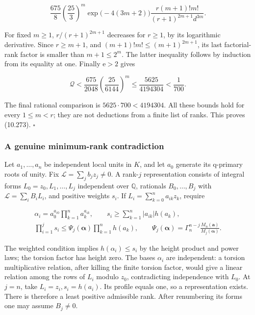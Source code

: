 \documentclass[
  11pt,
  a4paper,
]{article}
\begin{document}
\[
\frac{675}{8}\left(\frac{25}{3}\right)^m
\exp\bigl(-4(3m+2)\bigr)
\frac{r(m+1)!m!}{(r+1)^{2m+1}d^{3m}}.
\]

For fixed \(m\ge1\), \(r/(r+1)^{2m+1}\) decreases for \(r\ge1\), by its
logarithmic derivative. Since \(r\ge m+1\), and
\((m+1)!m!\le(m+1)^{2m+1}\), its last factorial-rank factor is smaller
than \(m+1\le2^m\). The latter inequality follows by induction from its
equality at one. Finally \(\mathrm e>2\) gives

\[
\mathcal Q<
\frac{675}{2048}\left(\frac{25}{6144}\right)^m
\le\frac{5625}{4194304}<\frac1{700}.
\tag{10.276}
\]

The final rational comparison is \(5625\cdot700<4194304\). All these
bounds hold for every \(1\le m<r\); they are not deductions from a
finite list of ranks. This proves (10.273). \(\square\)

\subsubsection{A genuine minimum-rank
contradiction}\label{a-genuine-minimum-rank-contradiction}

Let \(a_1,\ldots,a_n\) be independent local units in \(K\), and let
\(a_0\) generate its q-primary roots of unity. Fix
\(\mathcal L=\sum_jb_jz_j\ne0\). A rank-\(j\) representation consists of
integral forms \(L_0=z_0,L_1,\ldots,L_j\) independent over
\(\mathbb Q\), rationals \(B_0,\ldots,B_j\) with
\(\mathcal L=\sum_iB_iL_i\), and positive weights \(s_i\). If
\(L_i=\sum_{k=0}^na_{ik}z_k\), require

\[
\begin{gathered}
\alpha_i=a_0^{a_{i0}}\prod_{k=1}^na_k^{a_{ik}},\qquad
s_i\ge\sum_{k=1}^n|a_{ik}|h(a_k),\\
\prod_{i=1}^js_i\le
\Psi_j(\boldsymbol\alpha)\prod_{k=1}^nh(a_k),\qquad
\Psi_j(\boldsymbol\alpha)=
\Gamma_n^{n-j}\frac{M_n(\boldsymbol a)}{M_j(\boldsymbol\alpha)}.
\end{gathered}
\tag{10.277}
\]

The weighted condition implies \(h(\alpha_i)\le s_i\) by the height
product and power laws; the torsion factor has height zero. The bases
\(\alpha_i\) are independent: a torsion multiplicative relation, after
killing the finite torsion factor, would give a linear relation among
the rows of \(L_i\) modulo \(z_0\), contradicting independence with
\(L_0\). At \(j=n\), take \(L_i=z_i,s_i=h(a_i)\). Its profile equals
one, so a representation exists. There is therefore a least positive
admissible rank. After renumbering its forms one may assume \(B_j\ne0\).
\end{document}
